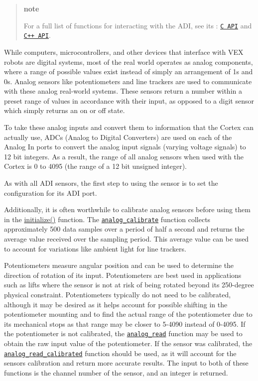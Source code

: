 \begin{quote}
{\bfseries note}

For a full list of functions for interacting with the A\+DI, see its \+: \href{../../api/c/adi.html}{\tt C A\+PI} and \href{../../api/cpp/adi.html}{\tt C++ A\+PI}.

\end{quote}


While computers, microcontrollers, and other devices that interface with V\+EX robots are digital systems, most of the real world operates as analog components, where a range of possible values exist instead of simply an arrangement of 1s and 0s. Analog sensors like potentiometers and line trackers are used to communicate with these analog real-\/world systems. These sensors return a number within a preset range of values in accordance with their input, as opposed to a digit sensor which simply returns an on or off state.

To take these analog inputs and convert them to information that the Cortex can actually use, A\+D\+Cs (Analog to Digital Converters) are used on each of the Analog In ports to convert the analog input signals (varying voltage signals) to 12 bit integers. As a result, the range of all analog sensors when used with the Cortex is 0 to 4095 (the range of a 12 bit unsigned integer).

As with all A\+DI sensors, the first step to using the sensor is to set the configuration for its A\+DI port.

Additionally, it is often worthwhile to calibrate analog sensors before using them in the {\ttfamily \hyperlink{main_8h_a9efe22aaead3a5e936b5df459de02eba}{initialize()}} function. The \href{../../api/c/adi.html#adi-analog-calibrate}{\tt analog\+\_\+calibrate} function collects approximately 500 data samples over a period of half a second and returns the average value received over the sampling period. This average value can be used to account for variations like ambient light for line trackers.

Potentiometers measure angular position and can be used to determine the direction of rotation of its input. Potentiometers are best used in applications such as lifts where the sensor is not at risk of being rotated beyond its 250-\/degree physical constraint. Potentiometers typically do not need to be calibrated, although it may be desired as it helps account for possible shifting in the potentiometer mounting and to find the actual range of the potentiometer due to its mechanical stops as that range may be closer to 5-\/4090 instead of 0-\/4095. If the potentiometer is not calibrated, the \href{../../api/c/adi.html#adi-analog-read}{\tt analog\+\_\+read} function may be used to obtain the raw input value of the potentiometer. If the sensor was calibrated, the \href{../../api/c/adi.html#adi-analog-read-calibrated}{\tt analog\+\_\+read\+\_\+calibrated} function should be used, as it will account for the sensor\textquotesingle{}s calibration and return more accurate results. The input to both of these functions is the channel number of the sensor, and an integer is returned.

